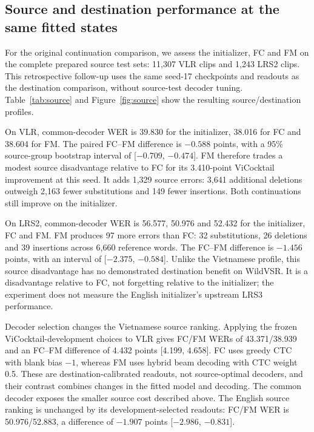 \subsection{Source and destination performance at the same fitted states}
\label{sec:source}
For the original continuation comparison, we assess the initializer, FC and FM
on the complete prepared source test sets:
11,307 VLR clips and 1,243 LRS2 clips. This retrospective follow-up uses the
same seed-17 checkpoints and readouts as the destination comparison, without
source-test decoder tuning. Table~\ref{tab:source} and Figure~\ref{fig:source}
show the resulting source/destination profiles.



On VLR, common-decoder WER is 39.830 for the initializer, 38.016 for FC and
38.604 for FM. The paired FC--FM difference is $-0.588$ points, with a
95\% source-group bootstrap interval of [$-0.709$, $-0.474$]. FM therefore
trades a modest source disadvantage relative to FC for its 3.410-point
ViCocktail improvement at this seed. It adds 1,329 source errors: 3,641
additional deletions outweigh 2,163 fewer substitutions and 149 fewer
insertions. Both continuations still improve on the initializer.

On LRS2, common-decoder WER is 56.577, 50.976 and 52.432 for the initializer,
FC and FM. FM produces 97 more errors than FC: 32 substitutions, 26 deletions
and 39 insertions across 6,660 reference words. The FC--FM difference is
$-1.456$ points, with an interval of [$-2.375$, $-0.584$]. Unlike the
Vietnamese profile, this source disadvantage has no demonstrated destination
benefit on WildVSR. It is a disadvantage relative to FC, not forgetting
relative to the initializer; the experiment does not measure the English
initializer's upstream LRS3 performance.

Decoder selection changes the Vietnamese source ranking. Applying the frozen
ViCocktail-development choices to VLR gives FC/FM WERs of 43.371/38.939 and
an FC--FM difference of 4.432 points [4.199, 4.658]. FC uses greedy CTC with
blank bias $-1$, whereas FM uses hybrid beam decoding with CTC weight 0.5.
These are destination-calibrated readouts, not source-optimal decoders, and
their contrast combines changes in the fitted model and decoding. The common
decoder exposes the smaller source cost described above. The English source
ranking is unchanged by its development-selected readouts: FC/FM WER is
50.976/52.883, a difference of $-1.907$ points [$-2.986$, $-0.831$].

